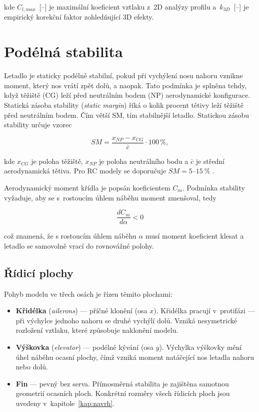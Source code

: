 \documentclass[12pt, a4paper, oneside]{report}
\begin{document}
kde $C_{l,max}$~[--] je maximální koeficient vztlaku z~2D analýzy profilu
a~$k_{3D}$~[--] je empirický korekční faktor zohledňující 3D efekty.



\section{Podélná stabilita}
\label{sec:stabilita}

Letadlo je staticky podélně stabilní, pokud při vychýlení nosu nahoru
vznikne moment, který nos vrátí zpět dolů, a naopak. Tato podmínka
je splněna tehdy, když těžiště (CG) leží před neutrálním bodem (NP)
aerodynamické konfigurace. Statická zásoba stability (\textit{static margin}) říká o kolik procent tětivy leží těžiště před neutrálním bodem. Čím větší SM, tím stabilnější letadlo.
 Statickou zásobu stability určuje vzorec
 
\begin{equation}
    SM = \frac{x_{NP} - x_{CG}}{\bar{c}} \cdot 100\,\% ,
    \label{eq:SM}
\end{equation}

kde $x_{CG}$ je poloha těžiště, $x_{NP}$ je poloha neutrálního bodu a $\bar{c}$ je střední aerodynamická tětiva. Pro RC modely se doporučuje
$SM= 5$--$15~\%$ \cite{drela_lab8}.

Aerodynamický moment křídla je popsán koeficientem $C_m$. 
Podmínka stability vyžaduje, aby se s~rostoucím úhlem náběhu 
moment zmenšoval, tedy

\begin{equation}
    \frac{dC_m}{d\alpha} < 0
    \label{eq:stabilita}
\end{equation}

což znamená, že s rostoucím úhlem náběhu $\alpha$ musí moment
koeficient klesat a letadlo se samovolně vrací do rovnovážné polohy.

\subsection{Řídicí plochy}

Pohyb modelu ve třech osách je řízen těmito plochami:

\begin{itemize}
    \item \textbf{Křidélka} (\textit{ailerons}) --- příčné klonění (osa $x$).
          Křidélka pracují v~protifázi --- při výchylce jednoho nahoru
          se druhé vychýlí dolů. Vzniká nesymetrické rozložení vztlaku,
          které způsobuje naklonění modelu.
    \item \textbf{Výškovka} (\textit{elevator}) --- podélné kývání (osa $y$).
          Výchylka výškovky mění úhel náběhu ocasní plochy, čímž vzniká
          moment natáčející nos letadla nahoru nebo dolů.
    \item \textbf{Fin} --- pevný bez serva. Přímosměrná stabilita
          je zajištěna samotnou geometrií ocasních ploch.
          Konkrétní rozměry všech řídicích ploch jsou uvedeny
          v~kapitole~\ref{kap:navrh}.
\end{itemize}
\end{document}
